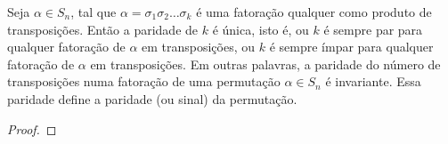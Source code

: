 \documentclass[11pt,openany]{book}
\newenvironment{novo}{
    \color{red}
}{}
\begin{document}
\begin{novo}
\begin{proposition}
\label{prop:S_n_paridade_unica}
    Seja $\alpha \in S_n$, tal que $\alpha = \sigma_1 \sigma_2 \dots \sigma_k$ é uma fatoração qualquer como produto de transposições. Então a paridade de $k$ é única, isto é, ou $k$ é sempre par para qualquer fatoração de $\alpha$ em transposições, ou $k$ é sempre ímpar para qualquer fatoração de $\alpha$ em transposições.  Em outras palavras, a paridade do número de transposições numa fatoração de uma permutação $\alpha \in S_n$ é invariante. Essa paridade define a paridade (ou sinal) da permutação.
\end{proposition}
\begin{proof}











\end{proof}
\end{novo}
\end{document}
